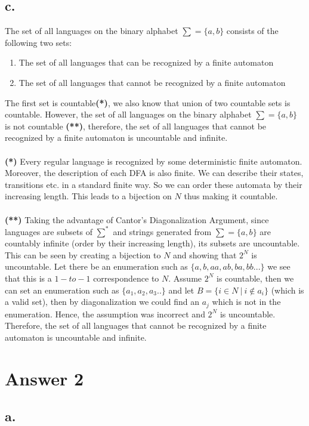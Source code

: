 \documentclass[12pt]{article}
\begin{document}
\subsection*{c.}
The set of all languages on the binary alphabet $\sum = \{a,b\}$ consists of the following two sets:
\begin{enumerate}
    \item The set of all languages that can be recognized by a finite automaton
    \item The set of all languages that cannot be recognized by a finite automaton
\end{enumerate}
The first set is countable\textbf{(*)}, we also know that union of two countable sets is countable. However, the set of all languages on the binary alphabet $\sum = \{a,b\}$ is not countable \textbf{(**)}, therefore, the set of all languages that cannot be recognized by a finite automaton is uncountable and infinite.\\~\\
\indent \textbf{(*)} Every regular language is recognized by some deterministic finite automaton. Moreover, the description of each DFA is also finite. We can describe their states, transitions etc. in a standard finite way. So we can order these automata by their increasing length. This leads to a bijection on $N$ thus making it countable.\\~\\
\indent \textbf{(**)} Taking the advantage of Cantor's Diagonalization Argument, since languages are subsets of $\sum^*$ and strings generated from $\sum = \{a,b\}$ are countably infinite (order by their increasing length), its subsets are uncountable. This can be seen by creating a bijection to $N$ and showing that $2^N$ is uncountable. Let there be an enumeration such as $\{a,b,aa,ab,ba,bb...\}$ we see that this is a $1-to-1$ correspondence to $N$. Assume $2^N$ is countable, then we can set an enumeration such as $\{a_1,a_2,a_3..\}$ and let $B=\{i \in N~ |~ i \notin a_i\}$ (which is a valid set), then by diagonalization we could find an $a_j$ which is not in the enumeration. Hence, the assumption was incorrect and $2^N$ is uncountable.\\
Therefore, the set of all languages that cannot be recognized by a finite automaton is uncountable and infinite.
\section*{Answer 2}
\subsection*{a.}
\end{document}
